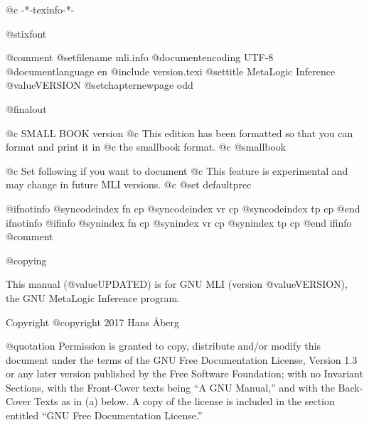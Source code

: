 %
%
%
%





 @c -*-texinfo-*-

@stixfont

@comment %
@setfilename mli.info
@documentencoding UTF-8
@documentlanguage en
@include version.texi
@settitle MetaLogic Inference @value{VERSION}
@setchapternewpage odd

@finalout

@c SMALL BOOK version
@c This edition has been formatted so that you can format and print it in
@c the smallbook format.
@c @smallbook

@c Set following if you want to document %
@c This feature is experimental and may change in future MLI versions.
@c @set defaultprec

@ifnotinfo
@syncodeindex fn cp
@syncodeindex vr cp
@syncodeindex tp cp
@end ifnotinfo
@ifinfo
@synindex fn cp
@synindex vr cp
@synindex tp cp
@end ifinfo
@comment %

@copying

This manual (@value{UPDATED}) is for GNU MLI (version
@value{VERSION}), the GNU MetaLogic Inference program.

Copyright @copyright{} 2017 Hans Åberg

@quotation
Permission is granted to copy, distribute and/or modify this document
under the terms of the GNU Free Documentation License,
Version 1.3 or any later version published by the Free Software
Foundation; with no Invariant Sections, with the Front-Cover texts
being ``A GNU Manual,'' and with the Back-Cover Texts as in
(a) below.  A copy of the license is included in the section entitled
``GNU Free Documentation License.''

